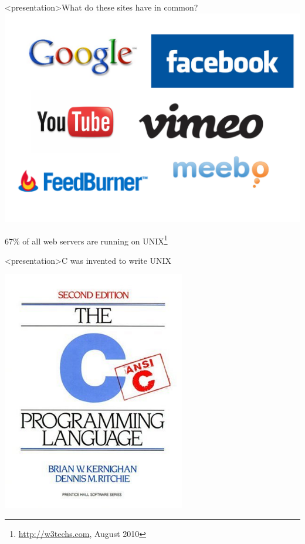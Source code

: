 \begin{frame}<presentation>{What do these sites have in common?}
\includegraphics[width=\textwidth]{site_logos} 
\pause

\begin{Large}
67\% of all web servers are running on UNIX\footnote{\url{http://w3techs.com}, August 2010}
\end{Large}
\end{frame}

\begin{frame}<presentation>{C was invented to write UNIX}
\begin{center}
\includegraphics[width=0.6\textwidth]{c}
\end{center}
\end{frame}

